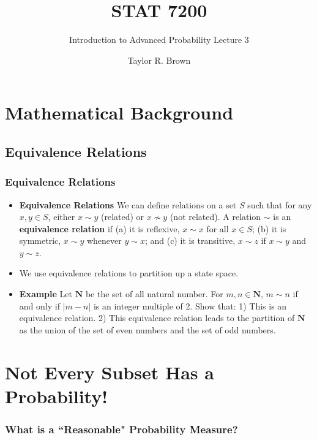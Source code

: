 \documentclass[handout]{beamer}
\title{STAT 7200}
\subtitle{Introduction to Advanced Probability \newline Lecture 3}
\author{Taylor R. Brown}
\institute{}
\date{}
\begin{document}
\frame{\titlepage}

\section[Outline]{}



\section{Mathematical Background}




\subsection{Equivalence Relations} 

\frame
{
  \frametitle{Equivalence Relations}

   \begin{itemize}
   
 
\item<1-> \textbf{Equivalence Relations} We can define relations on a set $S$ such that for any $x,y\in S$, either $x\sim y$ (related) or  $x\not \sim y$ (not related). A relation $\sim$ is an {\bf equivalence relation} if (a) it is reflexive, $x\sim x$ for all $x\in S$; (b) it is symmetric, $x\sim y$ whenever $y\sim x$; and (c) it is transitive, $x\sim z$ if $x\sim y$ and $y\sim z$.
  
\item<2-> We use equivalence relations to partition up a state space.
       
\item<3->  \textbf{Example } Let $\mathbf{N}$ be the set of all natural number. For $m, n \in \mathbf{N}$,  $m \sim n$ if and only if $|m-n|$ is an integer multiple of 2.  Show that: 1) This is an equivalence relation. 2) This equivalence relation leads to the partition of $\mathbf{N}$ as the union of the set of even numbers and the set of odd numbers.        
  \end{itemize}
}

\section{Not Every Subset Has a Probability!}
\subsubsection{What is a ``Reasonable" Probability Measure?} 
\end{document}

